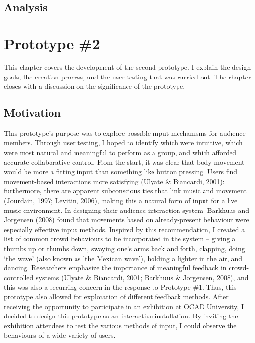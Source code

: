 \subsection{Analysis}



\section{Prototype \#2}

This chapter covers the development of the second prototype. I explain the design goals, the creation process, and the user testing that was carried out. The chapter closes with a discussion on the significance of the prototype.

\subsection{Motivation}

This prototype's purpose was to explore possible input mechanisms for audience members. Through user testing, I hoped to identify which were intuitive, which were most natural and meaningful to perform as a group, and which afforded accurate collaborative control. From the start, it was clear that body movement would be more a fitting input than something like button pressing. Users find movement-based interactions more satisfying (Ulyate \& Biancardi, 2001); furthermore, there are apparent subconscious ties that link music and movement (Jourdain, 1997; Levitin, 2006), making this a natural form of input for a live music environment. In designing their audience-interaction system, Barkhuus and Jorgensen (2008) found that movements based on already-present behaviour were especially effective input methods. Inspired by this recommendation, I created a list of common crowd behaviours to be incorporated in the system -- giving a thumbs up or thumbs down, swaying one's arms back and forth, clapping, doing `the wave' (also known as 'the Mexican wave'), holding a lighter in the air, and dancing. Researchers emphasize the importance of meaningful feedback in crowd-controlled systems (Ulyate \& Biancardi, 2001; Barkhuus \& Jorgensen, 2008), and this was also a recurring concern in the response to Prototype \#1. Thus, this prototype also allowed for exploration of different feedback methods. After receiving the opportunity to participate in an exhibition at OCAD University, I decided to design this prototype as an interactive installation. By inviting the exhibition attendees to test the various methods of input, I could observe the behaviours of a wide variety of users.

